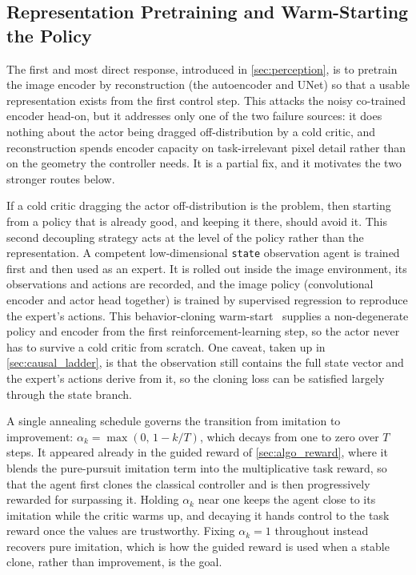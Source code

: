 \subsection{Representation Pretraining and Warm-Starting the Policy}

The first and most direct response, introduced in \cref{sec:perception}, is to pretrain the image encoder by reconstruction (the autoencoder and UNet) so that a usable representation exists from the first control step. This attacks the noisy co-trained encoder head-on, but it addresses only one of the two failure sources: it does nothing about the actor being dragged off-distribution by a cold critic, and reconstruction spends encoder capacity on task-irrelevant pixel detail rather than on the geometry the controller needs. It is a partial fix, and it motivates the two stronger routes below.

If a cold critic dragging the actor off-distribution is the problem, then starting from a policy that is already good, and keeping it there, should avoid it. This second decoupling strategy acts at the level of the policy rather than the representation. A competent low-dimensional \texttt{state} observation agent is trained first and then used as an expert. It is rolled out inside the image environment, its observations and actions are recorded, and the image policy (convolutional encoder and actor head together) is trained by supervised regression to reproduce the expert's actions. This behavior-cloning warm-start~\cite{bojarski2016end} supplies a non-degenerate policy and encoder from the first reinforcement-learning step, so the actor never has to survive a cold critic from scratch. One caveat, taken up in \cref{sec:causal_ladder}, is that the observation still contains the full state vector and the expert's actions derive from it, so the cloning loss can be satisfied largely through the state branch.

A single annealing schedule governs the transition from imitation to improvement: $\alpha_k = \max(0,\, 1 - k/T)$, which decays from one to zero over $T$ steps. It appeared already in the guided reward of \cref{sec:algo_reward}, where it blends the pure-pursuit imitation term into the multiplicative task reward, so that the agent first clones the classical controller and is then progressively rewarded for surpassing it. Holding $\alpha_k$ near one keeps the agent close to its imitation while the critic warms up, and decaying it hands control to the task reward once the values are trustworthy. Fixing $\alpha_k = 1$ throughout instead recovers pure imitation, which is how the guided reward is used when a stable clone, rather than improvement, is the goal.

